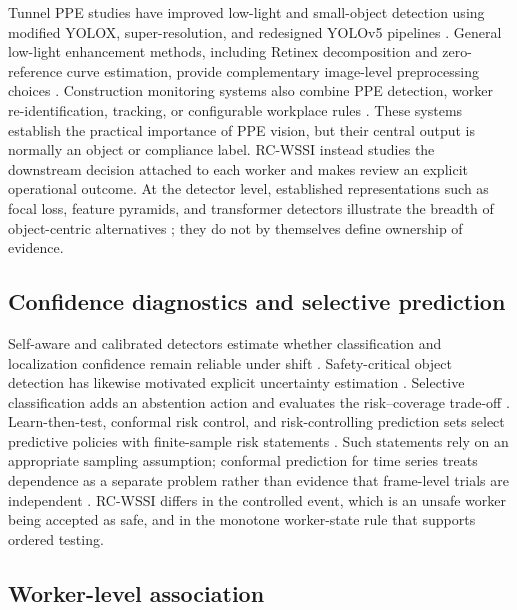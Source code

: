 \documentclass[iicol,pdflatex,sn-mathphys-num]{sn-jnl}
\begin{document}
Tunnel PPE studies have improved low-light and small-object detection using modified YOLOX, super-resolution, and redesigned YOLOv5 pipelines \cite{wang2023lowlight,malaikrisanachalee2025espcn,wu2025enhanced}. General low-light enhancement methods, including Retinex decomposition and zero-reference curve estimation, provide complementary image-level preprocessing choices \cite{wei2018retinex,guo2020zerodce}. Construction monitoring systems also combine PPE detection, worker re-identification, tracking, or configurable workplace rules \cite{nath2020site,cheng2022reid,lee2023safety,pisu2024workplace,liu2021cvreview}. These systems establish the practical importance of PPE vision, but their central output is normally an object or compliance label. RC-WSSI instead studies the downstream decision attached to each worker and makes review an explicit operational outcome. At the detector level, established representations such as focal loss, feature pyramids, and transformer detectors illustrate the breadth of object-centric alternatives \cite{lin2017focal,lin2017fpn,carion2020detr,bochkovskiy2020yolov4}; they do not by themselves define ownership of evidence.

\subsection{Confidence diagnostics and selective prediction}

Self-aware and calibrated detectors estimate whether classification and localization confidence remain reliable under shift \cite{oksuz2023selfaware,pathiraja2023multiclass}. Safety-critical object detection has likewise motivated explicit uncertainty estimation \cite{le2018uncertainty}. Selective classification adds an abstention action and evaluates the risk--coverage trade-off \cite{geifman2017selective}. Learn-then-test, conformal risk control, and risk-controlling prediction sets select predictive policies with finite-sample risk statements \cite{angelopoulos2021learntest,angelopoulos2022conformal,bates2021risk}. Such statements rely on an appropriate sampling assumption; conformal prediction for time series treats dependence as a separate problem rather than evidence that frame-level trials are independent \cite{xu2023timeseries}. RC-WSSI differs in the controlled event, which is an unsafe worker being accepted as safe, and in the monotone worker-state rule that supports ordered testing.

\subsection{Worker-level association}
\end{document}
